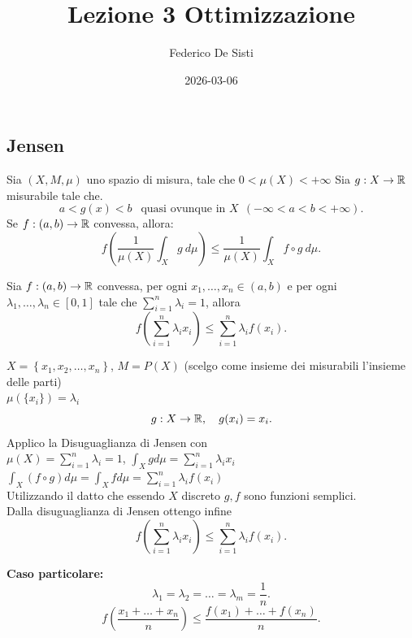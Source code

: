\documentclass[12px]{article}
\title{Lezione 3 Ottimizzazione}
\date{2026-03-06}
\author{Federico De Sisti}
\begin{document}
	\maketitle
	\newpage
	\subsection{Jensen}
  \begin{teo}
  	Sia $(X,M,\mu)$ uno spazio di misura, tale che  $0<\mu(X)< +\infty$ Sia  $g: X \rightarrow \mathbb{R}$ misurabile tale che.
	\[
		a < g(x) < b \ \ \text{ quasi ovunque in }X\ \ (-\infty<a<b<+\infty) 
	.\] 
	Se $f:(a,b) \rightarrow \mathbb{R}$ convessa, allora:\\
	\[
		f\left(\frac{1}{\mu(X)}\int_Xg\ d\mu\right)\leq \frac 1{\mu(X)}\int_Xf\circ g\ d\mu
	.\] 
  \end{teo}
  \begin{teo}
  Sia $f:(a,b) \rightarrow \mathbb{R}$ convessa, per ogni $x_1,\ldots,x_n\in(a,b)$ e per ogni $ \lambda_1,\ldots, \lambda_n\in[0,1]$ tale che $ \sum^{n}_{i=1} \lambda_i = 1$, allora
  \[
  f\left( \sum^{n}_{i=1} \lambda_i x_i\right)\leq \sum^{n}_{i=1} \lambda_if(x_i)
  .\] 
  \end{teo}
  \begin{dimo}
	  $X = \left\{ x_1,x_2,\ldots,x_n\right\}$, $M = P(X)$ (scelgo come insieme dei misurabili l'insieme delle parti)\\
	  $\mu(\{x_i\}) = \lambda_i$ 
	  \[
	  g: X \rightarrow \mathbb{R}, \ \ \ g(x_i) = x_i
	  .\] 
	  Applico la Disuguaglianza di Jensen con\\
	  $\mu(X) = \sum^{n}_{i=1}\lambda_i = 1$, $\int_Xg d\mu = \sum^{n}_{i=1} \lambda_ix_i$\\
	  $\int_X(f\circ g)d \mu = \int_X fd\mu = \sum^{n}_{i=1} \lambda_if(x_i)$ \\
	  Utilizzando il datto che essendo $X$ discreto $g,f$ sono funzioni semplici.\\
	  Dalla disuguaglianza di Jensen ottengo infine
	  \[
	  f \left( \sum^{n}_{i=1} \lambda_ix_i \right) \leq \sum^{n}_{i=1} \lambda_if(x_i)
	  .\] 
  \end{dimo}
  \textbf{Caso particolare:}
  \[
  \lambda_1 = \lambda_2 = \ldots = \lambda_m = \frac 1n
  .\]
  \[
	  f \left( \frac{ x_1 + \ldots + x_n}n \right) \leq \frac{f(x_1) + \ldots + f(x_n)}n
  .\] 
\end{document}
